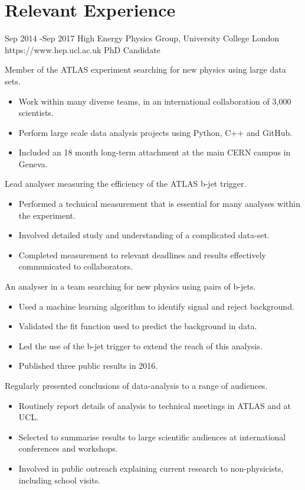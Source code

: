 \documentclass[10pt]{article} %
\begin{document}
\section{Relevant Experience}
\job
{Sep 2014 -}{Sep 2017}
{High Energy Physics Group, University College London}
{https://www.hep.ucl.ac.uk}
{PhD Candidate}
{
  \begin{itemize-noindent}
  \item{Member of the ATLAS experiment searching for new physics using large data sets.}
    \begin{itemize}
    \item{Work within many diverse teams, in an international collaboration of 3,000 scientists.}
    \item{Perform large scale data analysis projects using Python, C++ and GitHub.}
    \item{Included an 18 month long-term attachment at the main CERN campus in Geneva.} 
    \end{itemize}
  \item{Lead analyser measuring the efficiency of the ATLAS b-jet trigger.}
    \begin{itemize}
    \item{Performed a technical measurement that is essential for many analyses within the experiment.}
    \item{Involved detailed study and understanding of a complicated data-set.}
    \item{Completed measurement to relevant deadlines and results effectively communicated to collaborators.}
    \end{itemize}
  \item{ An analyser in a team searching for new physics using pairs of b-jets.}
    \begin{itemize}
    \item{Used a machine learning algorithm to identify signal and reject background.}
    \item{Validated the fit function used to predict the background in data.}
    \item{Led the use of the b-jet trigger to extend the reach of this analysis.}
    \item{Published three public results in 2016.}
    \end{itemize}
 \item{Regularly presented conclusions of data-analysis to a range of audiences.}
   \begin{itemize}
   \item{Routinely report details of analysis to technical meetings in ATLAS and at UCL.}
   \item{Selected to summarise results to large scientific audiences at international conferences and workshops.}
   \item{Involved in public outreach explaining current research to non-physicists, including school visits.}
   \end{itemize}
 \end{itemize-noindent}
}
\end{document}
